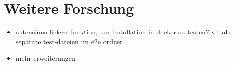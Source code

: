 \section{Weitere Forschung}
\label{further_research}
\begin{itemize}
\item extensions liefern funktion, um installation in docker zu testen? vlt als separate test-dateien im e2e ordner
\item mehr erweiterungen
\end{itemize}
